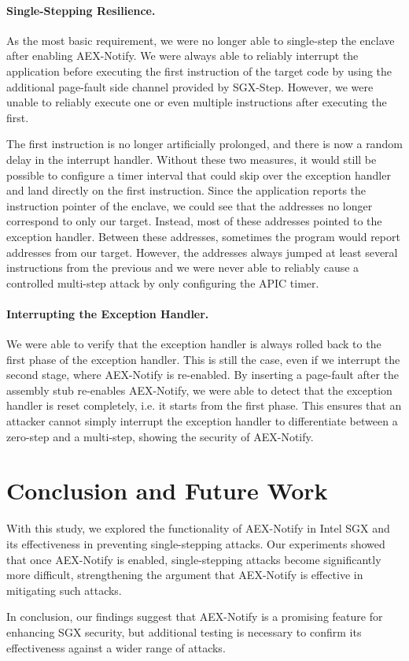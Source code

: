 \documentclass{llncs}
\begin{document}
\paragraph{Single-Stepping Resilience.}
As the most basic requirement,
we were no longer able to single-step the enclave after enabling AEX-Notify.
We were always able to reliably interrupt the application
before executing the first instruction of the target code
by using the additional page-fault side channel provided by SGX-Step.
However, we were unable to reliably execute one or
even multiple instructions after executing the first.

The first instruction is no longer artificially prolonged, and there is now a random delay in the interrupt handler. Without these two measures, it would still be possible to configure a timer interval that could skip over the exception handler and land directly on the first instruction.
Since the application reports the instruction pointer of the enclave,
we could see that the addresses no longer correspond to only our target.
Instead, most of these addresses pointed to the exception handler.
Between these addresses, sometimes the program would report addresses from our target.
However, the addresses always jumped at least several instructions from the previous
and we were never able to reliably cause a controlled multi-step attack
by only configuring the APIC timer.


\paragraph{Interrupting the Exception Handler.}
We were able to verify that the exception handler is always rolled back to the first phase of the exception handler.
This is still the case, even if we interrupt the second stage, where AEX-Notify is re-enabled.
By inserting a page-fault after the assembly stub re-enables AEX-Notify,
we were able to detect that the exception handler is reset completely,
i.e. it starts from the first phase.
This ensures that an attacker cannot simply interrupt the exception handler
to differentiate between a zero-step and a multi-step,
showing the security of AEX-Notify.

\section{Conclusion and Future Work}

With this study, we explored the functionality of AEX-Notify in Intel SGX and
its effectiveness in preventing single-stepping attacks.
Our experiments showed that once AEX-Notify is enabled, single-stepping attacks become significantly more difficult, strengthening the argument that AEX-Notify is effective in mitigating such attacks.

In conclusion, our findings suggest that AEX-Notify is a promising feature for enhancing SGX security,
but additional testing is necessary to confirm its effectiveness against a wider range of attacks.


%

\end{document}
